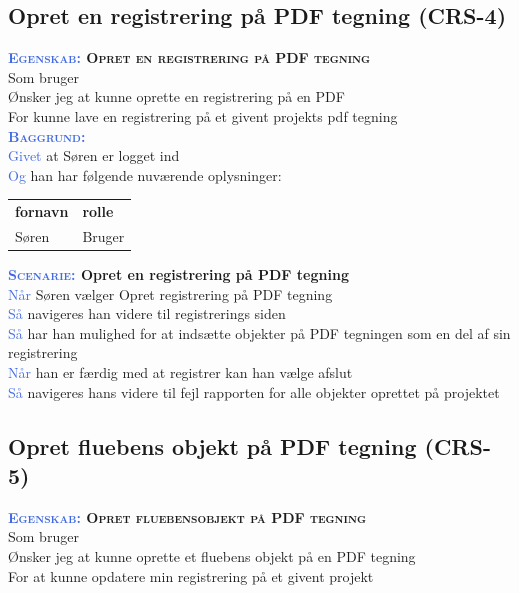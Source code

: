 \subsection{Opret en registrering på PDF tegning (CRS-4)} \label{sec:USOpretRegPåPDF}
\textbf{\textsc{\textcolor{RoyalBlue}{Egenskab:} Opret en registrering på PDF tegning}}\\
Som bruger\\
Ønsker jeg at kunne oprette en registrering på en PDF\\
For kunne lave en registrering på et givent projekts pdf tegning \\

\textsc{\textcolor{RoyalBlue}{\textbf{Baggrund:}}}\\
\textcolor{RoyalBlue}{Givet} at Søren er logget ind\\
\textcolor{RoyalBlue}{Og} han har følgende nuværende oplysninger:\\
\begin{tabular}{| l | l |}
	\textbf{fornavn} & \textbf{rolle} \\
	Søren & Bruger\\
\end{tabular}

\textbf{\textsc{\textcolor{RoyalBlue}{Scenarie:}} Opret en registrering på PDF tegning}\\
\textcolor{RoyalBlue}{Når} Søren vælger Opret registrering på PDF tegning\\
\textcolor{RoyalBlue}{Så}  navigeres han videre til registrerings siden\\
\textcolor{RoyalBlue}{Så}  har han mulighed for at indsætte objekter på PDF tegningen som en del af sin registrering\\
\textcolor{RoyalBlue}{Når} han er færdig med at registrer kan han vælge afslut \\
\textcolor{RoyalBlue}{Så}  navigeres hans videre til fejl rapporten for alle objekter oprettet på projektet \\

\subsection{Opret fluebens objekt på PDF tegning (CRS-5)} \label{sec:USOpretFlueben}
\textbf{\textsc{\textcolor{RoyalBlue}{Egenskab:} Opret fluebensobjekt på PDF tegning}}\\
Som bruger\\
Ønsker jeg at kunne oprette et fluebens objekt på en PDF tegning\\
For at kunne opdatere min registrering på et givent projekt \\

